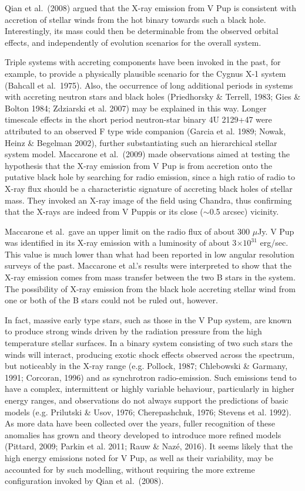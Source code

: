 \documentclass[useAMS,usenatbib]{mnras}                                                                           \usepackage[pdftex]{graphicx}
\begin{document}
 Qian et al.\ (2008) argued that the X-ray emission from 
 V Pup is consistent with accretion of stellar winds from the hot binary
 towards such a black hole.  Interestingly, its  mass could then be
  determinable from the observed orbital effects,
  and independently of evolution scenarios for the overall system.  

Triple systems
with accreting components have been invoked in the past, for example, to
provide a physically plausible scenario for the Cygnus X-1 system (Bahcall et al.\ 1975).
Also, the occurrence of long additional periods in systems
with accreting neutron stars and black holes (Priedhorsky \& Terrell, 1983; Gies \& Bolton 1984; Zdziarski et al. 2007) may be explained in this way.
Longer timescale effects in the   
short period neutron-star binary 4U 2129+47 were attributed to an observed F type
wide companion 
(Garcia et al. 1989; Nowak, Heinz \& Begelman 2002), further substantiating
such an hierarchical stellar system model.  Maccarone et al.\ (2009) made
observations aimed at testing the hypothesis that the X-ray 
emission from V Pup is from accretion onto the putative
black hole by searching for radio emission,
since a high ratio of radio to X-ray flux 
should be a characteristic signature of accreting black holes of stellar mass.
They invoked an X-ray image of the field using Chandra, thus confirming
that the X-rays are indeed from V Puppis or its close ($\sim$0.5 arcsec) vicinity.

Maccarone et al.\ gave an upper limit on the
radio flux of about 300 $\mu$Jy.  V Pup was 
identified in its X-ray emission with a luminosity of about 3$\times 10^{31}$
 erg/sec.  This  value is much
lower than what had been reported in low angular resolution surveys of
the past. Maccarone et al.'s results 
were interpreted to show  that the X-ray emission
comes from mass transfer between the two B stars in the system.
The possibility of X-ray emission from the black hole
accreting stellar wind from one or both of the B stars could not be ruled out, however.
 
In fact, massive early type stars, such as those in the V Pup system, 
are known to produce strong winds driven by the radiation pressure from the 
high temperature stellar surfaces.  In a binary system consisting of two such 
stars the winds will interact, producing exotic shock effects observed across 
the spectrum, but noticeably in the X-ray range 
(e.g. Pollock, 1987; Chlebowski \& Garmany, 1991; Corcoran, 1996) and as synchrotron
 radio-emission.   Such emissions tend to have a complex, intermittent 
 or highly variable behaviour, particularly in higher energy ranges, 
 and observations do not always support the predictions of basic models 
 (e.g. Prilutski \& Usov, 1976; Cherepashchuk, 1976; Stevens et al. 1992).  
 As more data have been collected over the years, fuller recognition of these 
 anomalies has grown and theory developed to introduce more refined models
   (Pittard, 2009;  Parkin et al. 2011; Rauw \& Naz\'{e}, 2016). It seems likely 
   that the high energy emissions noted for V Pup, as well as their variability, 
   may be accounted for by such modelling, without requiring the more extreme 
   configuration invoked by Qian et al.\ (2008). 
 
\end{document}
